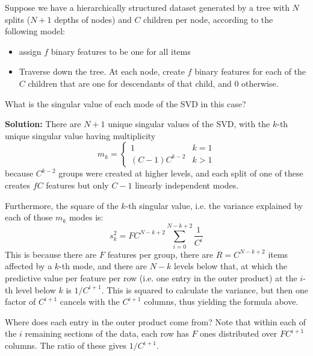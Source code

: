 \documentclass[11pt]{article}
\begin{document}
Suppose we have a hierarchically structured dataset generated by a tree with $N$ splits ($N+1$ depths of nodes) and $C$ children per node, according to the following model: 
\begin{itemize}
\item assign $f$ binary features to be one for all items
\item Traverse down the tree. At each node, create $f$ binary features for each of the $C$ children that are one for descendants of that child, and 0 otherwise. 
\end{itemize}
What is the singular value of each mode of the SVD in this case? \par
\textbf{Solution:} There are $N+1$ unique singular values of the SVD, with the $k$-th unique singular value having multiplicity 
$$m_k = \begin{cases}
1 & k = 1 \\
(C-1) C^{k-2}  & k > 1
\end{cases}
$$
because $C^{k-2}$ groups were created at higher levels, and each split of one of these creates $fC$ features but only $C-1$ linearly independent modes. \par
Furthermore, the square of the $k$-th singular value, i.e. the variance explained by each of those $m_k$ modes is:
$$s_k^2 = FC^{N-k+2} \sum_{i=0}^{N-k+2} \frac{1}{C^i}$$
This is because there are $F$ features per group, there are $R = C^{N-k+2}$ items affected by a $k$-th mode, and there are $N-k$ levels below that, at which the predictive value per feature per row (i.e. one entry in the outer product) at the $i$-th level below $k$ is $1/C^{i+1}$. This is squared to calculate the variance, but then one factor of $C^{i+1}$ cancels with the $C^{i+1}$ columns, thus yielding the formula above. \par
Where does each entry in the outer product come from? Note that within each of the $i$ remaining sections of the data, each row has $F$ ones distributed over $FC^{i+1}$ columns. The ratio of these gives $1/C^{i+1}$. 
\end{document}
